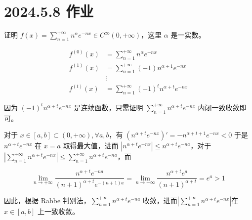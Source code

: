 \ifx\allfiles\undefined

\date{}
\author{尹锦润}

\maketitle
\fi

\section{2024.5.8 作业}
\begin{ques}
	证明 $\displaystyle f( x) =\sum _{n=1}^{+\infty } n^{\alpha } e^{-nx} \in C^{\infty }( 0,+\infty )$，这里 $\displaystyle \alpha $ 是一实数。
\end{ques}




\begin{align*}
	f^{( 0)}( x) & =\sum _{n=1}^{+\infty } n^{\alpha } e^{-nx}\\
	f^{( 1)}( x) & =\sum _{n=1}^{+\infty }( -1) n^{\alpha +1} e^{-nx}\\
	& \vdots \\
	f^{( t)}( x) & =\sum _{n=1}^{+\infty }( -1)^{t} n^{\alpha +t} e^{-nx}
\end{align*}


因为 $\displaystyle ( -1)^{t} n^{\alpha +t} e^{-nx}$ 是连续函数，只需证明 $\displaystyle \sum _{n=1}^{+\infty } n^{\alpha +t} e^{-nx}$ 内闭一致收敛即可。

对于 $\displaystyle x\in [ a,b] \subset ( 0,+\infty ) ,\forall a,b$，有 $\displaystyle \left( n^{\alpha +t} e^{-nx}\right) '=-n^{\alpha +t+1} e^{-nx} < 0$ 于是 $\displaystyle n^{\alpha +t} e^{-nx}$ 在 $\displaystyle x=a$ 取得最大值，进而 $\displaystyle |n^{\alpha +t} e^{-nx} |\leqslant n^{\alpha +t} e^{-na}$，对于 $\displaystyle \left| \sum _{n=1}^{+\infty } n^{\alpha +t} e^{-nx}\right| \leqslant \sum _{n=1}^{+\infty } n^{\alpha +t} e^{-na}$，而


\begin{equation*}
	\lim _{n\rightarrow +\infty }\frac{n^{\alpha +t} e^{-na}}{( n+1)^{\alpha +t} e^{-( n+1) a}} =\lim _{n\rightarrow +\infty }\frac{n^{\alpha +t} e^{a}}{( n+1)^{\alpha +t}} =e^{a}  >1
\end{equation*}


因此，根据 Rabbe 判别法，$\displaystyle \sum _{n=1}^{+\infty } n^{\alpha +t} e^{-na}$ 收敛，进而$\displaystyle \left| \sum _{n=1}^{+\infty } n^{\alpha +t} e^{-nx}\right| $在 $\displaystyle x\in [ a,b]$ 上一致收敛。

